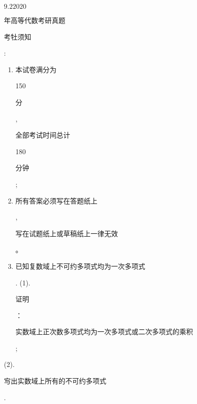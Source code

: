 \documentclass[10pt]{article}
\begin{document}
$9.22020$ \begin{CJK}{UTF8}{mj}年高等代数考研真题\end{CJK}

\begin{CJK}{UTF8}{mj}考牡须知\end{CJK}:

\begin{enumerate}
  \item \begin{CJK}{UTF8}{mj}本试卷满分为\end{CJK} 150 \begin{CJK}{UTF8}{mj}分\end{CJK}, \begin{CJK}{UTF8}{mj}全部考试时间总计\end{CJK} 180 \begin{CJK}{UTF8}{mj}分钟\end{CJK};

  \item \begin{CJK}{UTF8}{mj}所有答案必须写在答题纸上\end{CJK}, \begin{CJK}{UTF8}{mj}写在试题纸上或草稿纸上一律无效\end{CJK}。

  \item \begin{CJK}{UTF8}{mj}已知复数域上不可约多项式均为一次多项式\end{CJK}. (1). \begin{CJK}{UTF8}{mj}证明\end{CJK}：\begin{CJK}{UTF8}{mj}实数域上正次数多项式均为一次多项式或二次多项式的乘积\end{CJK};

\end{enumerate}
(2). \begin{CJK}{UTF8}{mj}㝍出实数域上所有的不可约多项式\end{CJK}.
\end{document}
